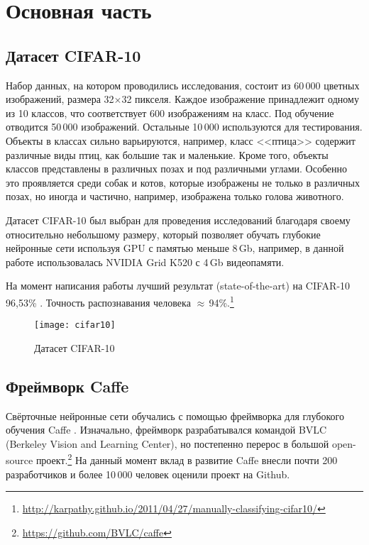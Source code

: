 \section{Основная часть}
\subsection{Датасет CIFAR-10}
Набор данных, на котором проводились исследования, состоит из 60\,000 цветных изображений, размера 
32$\times$32 пикселя. Каждое изображение принадлежит одному из 10 классов, что соответствует 600 изображениям на класс. Под 
обучение отводится 50\,000 изображений. Остальные 10\,000 используются для тестирования. Объекты в классах сильно варьируются, 
например, класс <<птица>> содержит различные виды птиц, как большие так и маленькие. Кроме того, объекты классов представлены в 
различных позах и под различными углами. Особенно это проявляется среди собак и котов, которые изображены не только в различных 
позах, но иногда и частично, например, изображена только голова животного.

Датасет CIFAR-10 \cite{learningmultiple} был выбран для проведения исследований благодаря своему относительно небольшому размеру, 
который позволяет обучать глубокие нейронные сети используя GPU с памятью меньше 8\,Gb, например, в данной работе использовалась 
NVIDIA Grid K520 с 4\,Gb видеопамяти.

На момент написания работы лучший результат (state-of-the-art) на CIFAR-10 96,53\% \cite{2014arXiv1412}. Точность  
распознавания человека $\approx$\,94\%.\footnote{\url{http://karpathy.github.io/2011/04/27/manually-classifying-cifar10/}}

\begin{figure}[h]
\centering
\texttt{[image: cifar10]}
\caption{Датасет CIFAR-10}
\end{figure}

\subsection{Фреймворк Caffe}
Свёрточные нейронные сети обучались с помощью фреймворка для глубокого обучения Caffe \cite{jia2014caffe}.
Изначально, фреймворк разрабатывался командой BVLC (Berkeley Vision and Learning Center), но постепенно перерос в большой 
open-source проект.\footnote{\url{https://github.com/BVLC/caffe}} На данный момент вклад в развитие Caffe внесли почти 200 
разработчиков и более 10\,000 человек оценили проект на Github.

